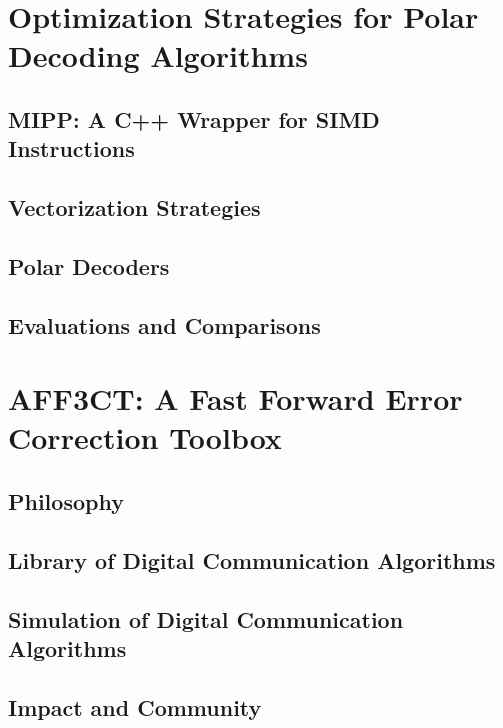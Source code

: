 \documentclass[t, compress, mathserif, 10pt, xcolor=dvipsnames, table, aspectratio=43]{beamer}
\begin{document}
\section[Optimization Strategies]{Optimization Strategies for Polar Decoding Algorithms}

\subsection[MIPP: A C++ Wrapper for SIMD Instructions]{MIPP: A C++ Wrapper for SIMD Instructions}

\subsection[Vectorization Strategies]{Vectorization Strategies}

\subsection[Polar Decoders]{Polar Decoders}

\subsection[Evaluations and Comparisons]{Evaluations and Comparisons}

\section[AFF3CT]{AFF3CT: A Fast Forward Error Correction Toolbox}

\subsection[Philosophy]{Philosophy}

\subsection[Library of Digital Communication Algorithms]{Library of Digital Communication Algorithms}

\subsection[Simulation of Digital Communication Algorithms]{Simulation of Digital Communication Algorithms}

\subsection[Impact and Community]{Impact and Community}
\end{document}
